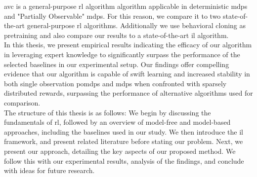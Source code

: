 \ac{avc} is a general-purpose \ac{rl} algorithm algorithm applicable in deterministic \ac{mdp}s and "Partially Observable" \ac{mdp}s. 
For this reason, we compare it to two state-of-the-art general-purpose \ac{rl} algorithms. Additionally we use behavioral cloning as pretraining  
and also compare our results to a state-of-the-art \ac{il} algorithm.\\

In this thesis, we present empirical results indicating the efficacy of our algorithm in leveraging expert knowledge to significantly surpass the performance of the selected baselines in our 
experimental setup. Our findings offer compelling evidence that our algorithm is capable of swift learning and increased stability in both single observation \ac{pomdp}s and \ac{mdp}s when confronted with 
sparsely distributed rewards, surpassing the performance of alternative algorithms used for comparison.\\

The structure of this thesis is as follows: We begin by discussing the fundamentals of \ac{rl}, followed by an overview of model-free and model-based approaches, 
including the baselines used in our study. We then introduce the \ac{il} framework, and present related literature before stating our problem. 
Next, we present our approach, detailing the key aspects of our proposed method. We follow this with our experimental results, analysis of the findings, and conclude with ideas for future research.